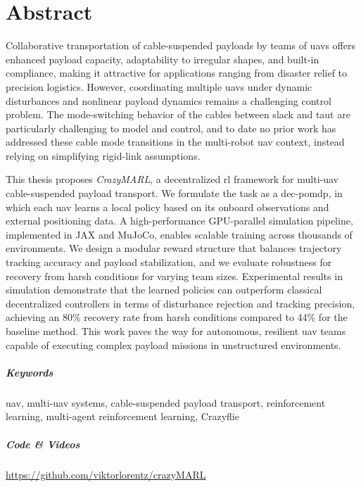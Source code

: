 \chapter*{Abstract}
\thispagestyle{empty}
Collaborative transportation of cable-suspended payloads by teams of \glspl{uav} offers enhanced payload capacity, adaptability to irregular shapes, and built-in compliance, making it attractive for applications ranging from disaster relief to precision logistics. However, coordinating multiple \glspl{uav} under dynamic disturbances and nonlinear payload dynamics remains a challenging control problem. The mode-switching behavior of the cables between slack and taut are particularly challenging to model and control, and to date no prior work has addressed these cable mode transitions in the multi-robot \gls{uav} context, instead relying on simplifying rigid-link assumptions. 

This thesis proposes \textit{CrazyMARL}, a decentralized \gls{rl} framework for multi-\gls{uav} cable-suspended payload transport. We formulate the task as a \gls{dec-pomdp}, in which each \gls{uav} learns a local policy based on its onboard observations and external positioning data. A high-performance GPU-parallel simulation pipeline, implemented in JAX and MuJoCo, enables scalable training across thousands of environments. We design a modular reward structure that balances trajectory tracking accuracy and payload stabilization, and we evaluate robustness for recovery from harsh conditions for varying team sizes. Experimental results in simulation demonstrate that the learned policies can outperform classical decentralized controllers in terms of disturbance rejection and tracking precision, achieving an 80\% recovery rate from harsh conditions compared to 44\% for the baseline method. This work paves the way for autonomous, resilient \gls{uav} teams capable of executing complex payload missions in unstructured environments.
\paragraph{Keywords}
\gls{uav}, multi-\gls{uav} systems, cable-suspended payload transport, reinforcement learning, multi-agent reinforcement learning, Crazyflie




\paragraph{Code \& Videos}
\url{https://github.com/viktorlorentz/crazyMARL}



